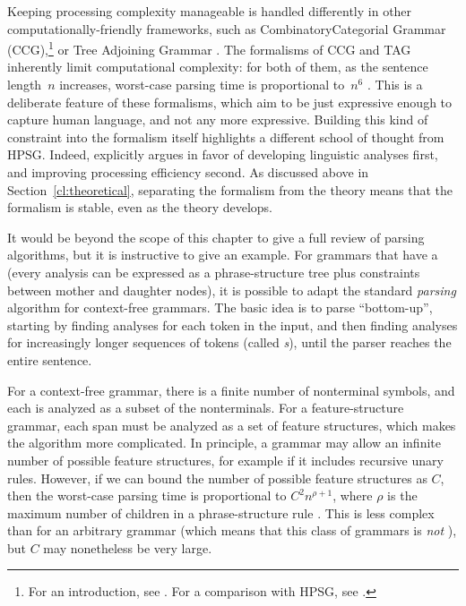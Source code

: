 \documentclass[output=paper
 	        ,biblatex
                ,babelshorthands
                ,newtxmath
                ,draftmode
                ,colorlinks, citecolor=brown
]{langscibook}
\begin{document}
\largerpage 
Keeping processing complexity manageable is handled differently in other computationally-friendly frameworks, such as Combinatory\indexccg Categorial Grammar (CCG),\footnote{%
	For an introduction, see \citet{steedman2011ccg}.
	For a comparison with HPSG, see .
}
or Tree Adjoining Grammar \citep[TAG;][]{Joshi87a-u,SAJ88a-u}.
The formalisms of CCG and TAG inherently limit computational complexity:
for both of them, as the sentence length~$n$ increases,
worst-case parsing time is proportional to~$n^6$ \citep{Kasamietal1989}.
This is a deliberate feature of these formalisms,
which aim to be just expressive enough to capture human language,
and not any more expressive.
Building this kind of constraint into the formalism itself
highlights a different school of thought from HPSG.
Indeed, \citet[64]{MuellerCoreGram} explicitly argues
in favor of developing linguistic analyses first,
and improving processing efficiency second.
As discussed above in Section~\ref{cl:theoretical},
separating the formalism from the theory
means that the formalism is stable, even as the theory develops.

It would be beyond the scope of this chapter to give a full review of parsing
algorithms, but it is instructive to give an example.  For grammars that have a  (every analysis can be expressed as a phrase-structure tree plus constraints between
mother and daughter nodes), it is possible to adapt the standard \textit{parsing} algorithm
\citep{kay:1973} for context-free grammars.
The basic idea is to parse ``bottom-up'',
starting by finding analyses for each token in the input,
and then finding analyses for increasingly longer sequences of tokens (called \textit{s}),
until the parser reaches the entire sentence.

For a context-free grammar,
there is a finite number of nonterminal symbols,
and each  is analyzed as a subset of the nonterminals.
For a feature-structure grammar, each span must be analyzed as a set of feature structures,
which makes the algorithm more complicated.
In principle, a grammar may allow an infinite number of possible feature structures,
for example if it includes recursive unary rules.
However, if we can bound the number of possible feature structures as $C$,
then the worst-case parsing time is proportional to $C^2 n^{\rho+1}$,
where $\rho$ is the maximum number of children in a phrase-structure rule
\citep[Section~3.2.3]{carroll1993parse}. 
This is less complex than for an arbitrary grammar
(which means that this class of grammars is \emph{not} ),
but $C$ may nonetheless be very large.
\end{document}
